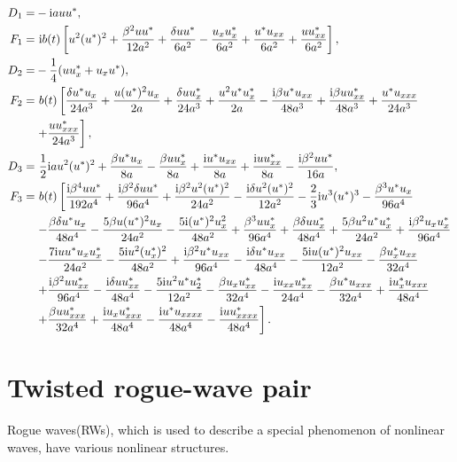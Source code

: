 \documentclass[12pt]{article}
\begin{document}
\begin{align}
  D_{1} =& -\mathrm{i}auu^{*}, \\
  F_{1} =&\ \mathrm{i}b(t) \left[ u^{2}(u^{*})^{2} + \frac{\beta^{2}uu^{*}}{12a^{2}} + \frac{\delta uu^{*}}{6a^{2}} - \frac{u_{x}u^{*}_{x}}{6a^{2}} + \frac{u^{*}u_{xx}}{6a^{2}} + \frac{uu^{*}_{xx}}{6a^{2}} \right], \\
  D_{2} =& -\frac{1}{4}(uu^{*}_{x} + u_{x}u^{*}), \\
  F_{2} =&\ b(t) \left[\frac{\delta u^{*}u_{x}}{24a^{3}} + \frac{u(u^{*})^{2}u_{x}}{2a} + \frac{\delta uu^{*}_{x}}{24a^{3}} + \frac{u^{2}u^{*}u^{*}_{x}}{2a} - \frac{\mathrm{i}\beta u^{*}u_{xx}}{48a^{3}} + \frac{\mathrm{i}\beta uu^{*}_{xx}}{48a^{3}} + \frac{u^{*}u_{xxx}}{24a^{3}} \right. \notag\\
  & \left. + \frac{uu^{*}_{xxx}}{24a^{3}} \right], \\
  D_{3} =&\ \frac{1}{2}\mathrm{i}au^{2}(u^{*})^{2} + \frac{\beta u^{*}u_{x}}{8a} - \frac{\beta uu^{*}_{x}}{8a} + \frac{\mathrm{i}u^{*}u_{xx}}{8a} + \frac{\mathrm{i}uu^{*}_{xx}}{8a} - \frac{\mathrm{i}\beta^{2}uu^{*}}{16a}, \\
  F_{3} =&\ b(t) \left[\frac{\mathrm{i}\beta^{4}uu^{*}}{192a^{4}} + \frac{\mathrm{i}\beta^{2}\delta uu^{*}}{96a^{4}} + \frac{\mathrm{i}\beta^{2}u^{2}(u^{*})^{2}}{24a^{2}} - \frac{\mathrm{i}\delta u^{2}(u^{*})^{2}}{12a^{2}} - \frac{2}{3}\mathrm{i}u^{3}(u^{*})^{3} - \frac{\beta^{3}u^{*}u_{x}}{96a^{4}}  \right. \notag\\
  & \left. - \frac{\beta\delta u^{*}u_{x}}{48a^{4}} - \frac{5\beta u(u^{*})^{2}u_{x}}{24a^{2}} - \frac{5\mathrm{i}(u^{*})^{2}u_{x}^{2}}{48a^{2}} + \frac{\beta^{3}uu^{*}_{x}}{96a^{4}} + \frac{\beta\delta uu^{*}_{x}}{48a^{4}} + \frac{5\beta u^{2}u^{*}u^{*}_{x}}{24a^{2}} + \frac{\mathrm{i}\beta^{2}u_{x}u^{*}_{x}}{96a^{4}} \right. \notag\\
  & \left. - \frac{7\mathrm{i}uu^{*}u_{x}u^{*}_{x}}{24a^{2}} - \frac{5\mathrm{i}u^{2}(u^{*}_{x})^{2}}{48a^{2}} + \frac{\mathrm{i}\beta^{2}u^{*}u_{xx}}{96a^{4}} - \frac{\mathrm{i}\delta u^{*}u_{xx}}{48a^{4}} - \frac{5\mathrm{i}u(u^{*})^{2}u_{xx}}{12a^{2}} - \frac{\beta u^{*}_{x}u_{xx}}{32a^{4}} \right. \notag\\
  & \left.  + \frac{\mathrm{i}\beta^{2}uu^{*}_{xx}}{96a^{4}} - \frac{\mathrm{i}\delta uu^{*}_{xx}}{48a^{4}} - \frac{5\mathrm{i}u^{2}u^{*}u^{*}_{2}}{12a^{2}} - \frac{\beta u_{x}u^{*}_{xx}}{32a^{4}} - \frac{\mathrm{i}u_{xx}u^{*}_{xx}}{24a^{4}} - \frac{\beta u^{*}u_{xxx}}{32a^{4}} + \frac{\mathrm{i}u^{*}_{x}u_{xxx}}{48a^{4}} \right. \notag\\
  & \left. + \frac{\beta uu^{*}_{xxx}}{32a^{4}} + \frac{\mathrm{i}u_{x}u^{*}_{xxx}}{48a^{4}} - \frac{\mathrm{i}u^{*}u_{xxxx}}{48a^{4}} - \frac{\mathrm{i}uu^{*}_{xxxx}}{48a^{4}}\right].
\end{align}

\section{Twisted rogue-wave pair}
Rogue waves(RWs), which is used to describe a special phenomenon of nonlinear waves, have various nonlinear structures. 
\end{document}
